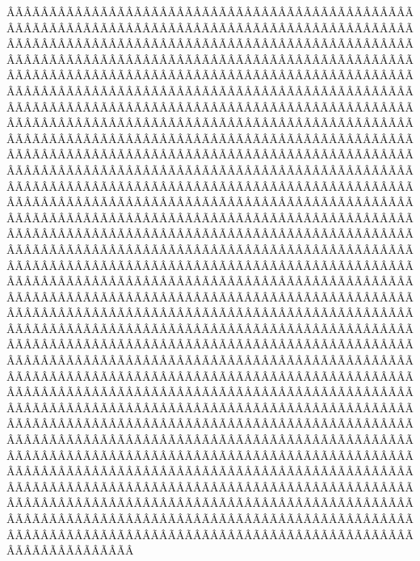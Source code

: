 \begin{sumilla}
\begin{objetivosdelcurso}
ÂÃÂÃÂÃÂÃÂÃÂÃÂÃÂÃÂÃÂÃÂÃÂÃÂÃÂÃÂÃÂÃÂÃÂÃÂÃÂÃÂÃÂÃÂÃÂÃÂÃÂÃÂÃÂÃÂÃÂÃÂÃÂÃÂÃÂÃÂÃÂÃÂÃÂÃÂÃÂÃÂÃÂÃÂÃÂÃÂÃÂÃÂÃÂÃÂÃÂÃÂÃÂÃÂÃÂÃÂÃÂÃÂÃÂÃÂÃÂÃÂÃÂÃÂÃÂÃÂÃÂÃÂÃÂÃÂÃÂÃÂÃÂÃÂÃÂÃÂÃÂÃÂÃÂÃÂÃÂÃÂÃÂÃÂÃÂÃÂÃÂÃÂÃÂÃÂÃÂÃÂÃÂÃÂÃÂÃÂÃÂÃÂÃÂÃÂÃÂÃÂÃÂÃÂÃÂÃÂÃÂÃÂÃÂÃÂÃÂÃÂÃÂÃÂÃÂÃÂÃÂÃÂÃÂÃÂÃÂÃÂÃÂÃÂÃÂÃÂÃÂÃÂÃÂÃÂÃÂÃÂÃÂÃÂÃÂÃÂÃÂÃÂÃÂÃÂÃÂÃÂÃÂÃÂÃÂÃÂÃÂÃÂÃÂÃÂÃÂÃÂÃÂÃÂÃÂÃÂÃÂÃÂÃÂÃÂÃÂÃÂÃÂÃÂÃÂÃÂÃÂÃÂÃÂÃÂÃÂÃÂÃÂÃÂÃÂÃÂÃÂÃÂÃÂÃÂÃÂÃÂÃÂÃÂÃÂÃÂÃÂÃÂÃÂÃÂÃÂÃÂÃÂÃÂÃÂÃÂÃÂÃÂÃÂÃÂÃÂÃÂÃÂÃÂÃÂÃÂÃÂÃÂÃÂÃÂÃÂÃÂÃÂÃÂÃÂÃÂÃÂÃÂÃÂÃÂÃÂÃÂÃÂÃÂÃÂÃÂÃÂÃÂÃÂÃÂÃÂÃÂÃÂÃÂÃÂÃÂÃÂÃÂÃÂÃÂÃÂÃÂÃÂÃÂÃÂÃÂÃÂÃÂÃÂÃÂÃÂÃÂÃÂÃÂÃÂÃÂÃÂÃÂÃÂÃÂÃÂÃÂÃÂÃÂÃÂÃÂÃÂÃÂÃÂÃÂÃÂÃÂÃÂÃÂÃÂÃÂÃÂÃÂÃÂÃÂÃÂÃÂÃÂÃÂÃÂÃÂÃÂÃÂÃÂÃÂÃÂÃÂÃÂÃÂÃÂÃÂÃÂÃÂÃÂÃÂÃÂÃÂÃÂÃÂÃÂÃÂÃÂÃÂÃÂÃÂÃÂÃÂÃÂÃÂÃÂÃÂÃÂÃÂÃÂÃÂÃÂÃÂÃÂÃÂÃÂÃÂÃÂÃÂÃÂÃÂÃÂÃÂÃÂÃÂÃÂÃÂÃÂÃÂÃÂÃÂÃÂÃÂÃÂÃÂÃÂÃÂÃÂÃÂÃÂÃÂÃÂÃÂÃÂÃÂÃÂÃÂÃÂÃÂÃÂÃÂÃÂÃÂÃÂÃÂÃÂÃÂÃÂÃÂÃÂÃÂÃÂÃÂÃÂÃÂÃÂÃÂÃÂÃÂÃÂÃÂÃÂÃÂÃÂÃÂÃÂÃÂÃÂÃÂÃÂÃÂÃÂÃÂÃÂÃÂÃÂÃÂÃÂÃÂÃÂÃÂÃÂÃÂÃÂÃÂÃÂÃÂÃÂÃÂÃÂÃÂÃÂÃÂÃÂÃÂÃÂÃÂÃÂÃÂÃÂÃÂÃÂÃÂÃÂÃÂÃÂÃÂÃÂÃÂÃÂÃÂÃÂÃÂÃÂÃÂÃÂÃÂÃÂÃÂÃÂÃÂÃÂÃÂÃÂÃÂÃÂÃÂÃÂÃÂÃÂÃÂÃÂÃÂÃÂÃÂÃÂÃÂÃÂÃÂÃÂÃÂÃÂÃÂÃÂÃÂÃÂÃÂÃÂÃÂÃÂÃÂÃÂÃÂÃÂÃÂÃÂÃÂÃÂÃÂÃÂÃÂÃÂÃÂÃÂÃÂÃÂÃÂÃÂÃÂÃÂÃÂÃÂÃÂÃÂÃÂÃÂÃÂÃÂÃÂÃÂÃÂÃÂÃÂÃÂÃÂÃÂÃÂÃÂÃÂÃÂÃÂÃÂÃÂÃÂÃÂÃÂÃÂÃÂÃÂÃÂÃÂÃÂÃÂÃÂÃÂÃÂÃÂÃÂÃÂÃÂÃÂÃÂÃÂÃÂÃÂÃÂÃÂÃÂÃÂÃÂÃÂÃÂÃÂÃÂÃÂÃÂÃÂÃÂÃÂÃÂÃÂÃÂÃÂÃÂÃÂÃÂÃÂÃÂÃÂÃÂÃÂÃÂÃÂÃÂÃÂÃÂÃÂÃÂÃÂÃÂÃÂÃÂÃÂÃÂÃÂÃÂÃÂÃÂÃÂÃÂÃÂÃÂÃÂÃÂÃÂÃÂÃÂÃÂÃÂÃÂÃÂÃÂÃÂÃÂÃÂÃÂÃÂÃÂÃÂÃÂÃÂÃÂÃÂÃÂÃÂÃÂÃÂÃÂÃÂÃÂÃÂÃÂÃÂÃÂÃÂÃÂÃÂÃÂÃÂÃÂÃÂÃÂÃÂÃÂÃÂÃÂÃÂÃÂÃÂÃÂÃÂÃÂÃÂÃÂÃÂÃÂÃÂÃÂÃÂÃÂÃÂÃÂÃÂÃÂÃÂÃÂÃÂÃÂÃÂÃÂÃÂÃÂÃÂÃÂÃÂÃÂÃÂÃÂÃÂÃÂÃÂÃÂÃÂÃÂÃÂÃÂÃÂÃÂÃÂÃÂÃÂÃÂÃÂÃÂÃÂÃÂÃÂÃÂÃÂÃÂÃÂÃÂÃÂÃÂÃÂÃÂÃÂÃÂÃÂÃÂÃÂÃÂÃÂÃÂÃÂÃÂÃÂÃÂÃÂÃÂÃÂÃÂÃÂÃÂÃÂÃÂÃÂÃÂÃÂÃÂÃÂÃÂÃÂÃÂÃÂÃÂÃÂÃÂÃÂÃÂÃÂÃÂÃÂÃÂÃÂÃÂÃÂÃÂÃÂÃÂÃÂÃÂÃÂÃÂÃÂÃÂÃÂÃÂÃÂÃÂÃÂÃÂÃÂÃÂÃÂÃÂÃÂÃÂÃÂÃÂÃÂÃÂÃÂÃÂÃÂÃÂÃÂÃÂÃÂÃÂÃÂÃÂÃÂÃÂÃÂÃÂÃÂÃÂÃÂÃÂÃÂÃÂÃÂÃÂÃÂÃÂÃÂÃÂÃÂÃÂÃÂÃÂÃÂÃÂÃÂÃÂÃÂÃÂÃÂÃÂÃÂÃÂÃÂÃÂÃÂÃÂÃÂÃÂÃÂÃÂÃÂÃÂÃÂÃÂÃÂÃÂÃÂÃÂÃÂÃÂÃÂÃÂÃÂÃÂÃÂÃÂÃÂÃÂÃÂÃÂÃÂÃÂÃÂÃÂÃÂÃÂ
\end{objetivosdelcurso}
\end{sumilla}
